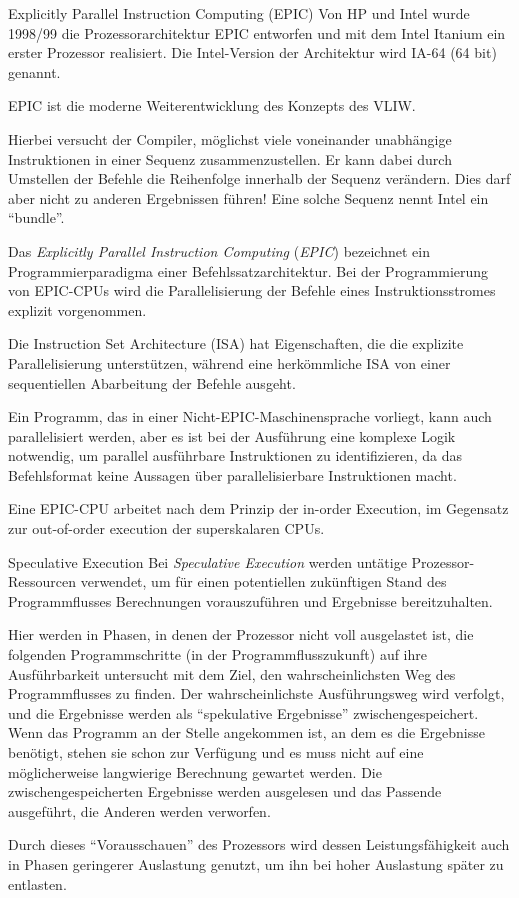 \begin{defi}[Befehlssatzarchitektur]{Explicitly Parallel Instruction Computing (EPIC)}
    Von HP und Intel wurde 1998/99 die Prozessorarchitektur EPIC entworfen und mit dem Intel Itanium ein erster Prozessor realisiert. 
    Die Intel-Version der Architektur wird IA-64 (64 bit) genannt.
    
    EPIC ist die moderne Weiterentwicklung des Konzepts des VLIW.
    
    Hierbei versucht der Compiler, möglichst viele voneinander unabhängige Instruktionen in einer Sequenz zusammenzustellen. 
    Er kann dabei durch Umstellen der Befehle die Reihenfolge innerhalb der Sequenz verändern. Dies darf aber nicht zu anderen Ergebnissen führen!
    Eine solche Sequenz nennt Intel ein \enquote{bundle}.
    
    Das \emph{Explicitly Parallel Instruction Computing} (\emph{EPIC}) bezeichnet ein Programmierparadigma einer Befehlssatzarchitektur.
    Bei der Programmierung von EPIC-CPUs wird die Parallelisierung der Befehle eines Instruktionsstromes explizit vorgenommen.
    
    Die Instruction Set Architecture (ISA) hat Eigenschaften, die die explizite Parallelisierung unterstützen, während eine herkömmliche ISA von einer sequentiellen Abarbeitung der Befehle ausgeht.
    
    Ein Programm, das in einer Nicht-EPIC-Maschinensprache vorliegt, kann auch parallelisiert werden, aber es ist bei der Ausführung eine komplexe Logik notwendig, um parallel ausführbare Instruktionen zu identifizieren, da das Befehlsformat keine Aussagen über parallelisierbare Instruktionen macht.
    
    Eine EPIC-CPU arbeitet nach dem Prinzip der in-order Execution, im Gegensatz zur out-of-order execution der superskalaren CPUs.
\end{defi}

\begin{defi}{Speculative Execution}
    Bei \emph{Speculative Execution} werden untätige Prozessor-Ressourcen verwendet, um für einen potentiellen zukünftigen Stand des Programmflusses Berechnungen vorauszuführen und Ergebnisse bereitzuhalten.
    
    Hier werden in Phasen, in denen der Prozessor nicht voll ausgelastet ist, die folgenden Programmschritte (in der Programmflusszukunft) auf ihre Ausführbarkeit untersucht mit dem Ziel, den wahrscheinlichsten Weg des Programmflusses zu finden.
    Der wahrscheinlichste Ausführungsweg wird verfolgt, und die Ergebnisse werden als \enquote{spekulative Ergebnisse} zwischengespeichert.
    Wenn das Programm an der Stelle angekommen ist, an dem es die Ergebnisse benötigt, stehen sie schon zur Verfügung und es muss nicht auf eine möglicherweise langwierige Berechnung gewartet werden.
    Die zwischengespeicherten Ergebnisse werden ausgelesen und das Passende ausgeführt, die Anderen werden verworfen.
    
    Durch dieses \enquote{Vorausschauen} des Prozessors wird dessen Leistungsfähigkeit auch in Phasen geringerer Auslastung genutzt, um ihn bei hoher Auslastung später zu entlasten.
\end{defi}

